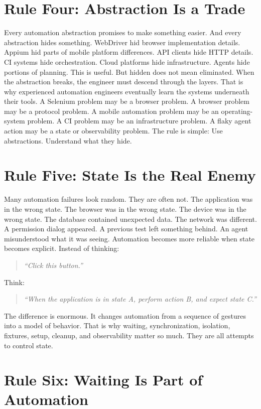 \documentclass[11pt,twoside]{book}
\begin{document}
\section*{Rule Four: Abstraction Is a Trade}

Every automation abstraction promises to make something easier.
And every abstraction hides something.
WebDriver hid browser implementation details.
Appium hid parts of mobile platform differences.
API clients hide HTTP details.
CI systems hide orchestration.
Cloud platforms hide infrastructure.
Agents hide portions of planning.
This is useful.
But hidden does not mean eliminated.
When the abstraction breaks, the engineer must descend through the layers.
That is why experienced automation engineers eventually learn the systems underneath their tools.
A Selenium problem may be a browser problem.
A browser problem may be a protocol problem.
A mobile automation problem may be an operating-system problem.
A CI problem may be an infrastructure problem.
A flaky agent action may be a state or observability problem.
The rule is simple:
Use abstractions. Understand what they hide.

\section*{Rule Five: State Is the Real Enemy}

Many automation failures look random.
They are often not.
The application was in the wrong state.
The browser was in the wrong state.
The device was in the wrong state.
The database contained unexpected data.
The network was different.
A permission dialog appeared.
A previous test left something behind.
An agent misunderstood what it was seeing.
Automation becomes more reliable when state becomes explicit.
Instead of thinking:
\begin{quote}
\emph{``Click this button.''}
\end{quote}
Think:
\begin{quote}
\emph{``When the application is in state A, perform action B, and expect state C.''}
\end{quote}
The difference is enormous.
It changes automation from a sequence of gestures into a model of behavior.
That is why waiting, synchronization, isolation, fixtures, setup, cleanup, and observability matter so much.
They are all attempts to control state.

\section*{Rule Six: Waiting Is Part of Automation}
\end{document}
